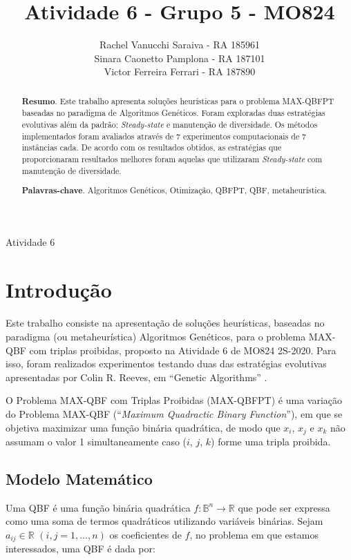\documentclass{MO824}
\title{Atividade 6 - Grupo 5 - MO824}
\author{
    Rachel Vanucchi Saraiva  - RA 185961\\
    Sinara Caonetto Pamplona - RA 187101\\
    Victor Ferreira Ferrari  - RA 187890
}
\newcommand{\B}{\mathbb{B}}
\newcommand{\R}{\mathbb{R}}
\begin{document}
\criartitulo

%
{Atividade 6}

\begin{abstract}
{\bf Resumo}. Este trabalho apresenta soluções heurísticas para o problema MAX-QBFPT baseadas no paradigma de Algoritmos Genéticos. Foram exploradas duas estratégias evolutivas além da padrão:  \textit{Steady-state} e manutenção de diversidade. Os métodos implementados foram avaliados através de 7 experimentos computacionais de 7 instâncias cada. De acordo com os resultados obtidos, as estratégias que proporcionaram resultados melhores foram aquelas que utilizaram \textit{Steady-state} com manutenção de diversidade.

{\bf Palavras-chave}. Algoritmos Genéticos, Otimização, QBFPT, QBF, metaheurística.

\end{abstract}

\section{Introdução}
    \paragraph*{}
    Este trabalho consiste na apresentação de soluções heurísticas, baseadas no paradigma (ou metaheurística) Algoritmos Genéticos, para o problema MAX-QBF com triplas proibidas, proposto na Atividade 6 de MO824 2S-2020. Para isso, foram realizados experimentos testando duas das estratégias evolutivas apresentadas por Colin R. Reeves, em ``Genetic Algorithms'' \cite{ga}.
    
    O Problema MAX-QBF com Triplas Proibidas (MAX-QBFPT) é uma variação do Problema  MAX-QBF (``\textit{Maximum Quadractic Binary Function}''), em que se objetiva maximizar uma função binária quadrática, de modo que $x_i$, $x_j$ e $x_k$ não assumam o valor 1 simultaneamente caso ($i$, $j$, $k$) forme uma tripla proibida. 
    
    \subsection{Modelo Matemático}
    Uma QBF é uma função binária quadrática $f:\B^n \rightarrow \R$ que pode ser expressa como uma soma de termos quadráticos utilizando variáveis binárias. Sejam~$a_{ij} \in \mathbb{R}$ $(i,j = 1,\dots,n)$ os coeficientes de $f$, no problema em que estamos interessados, uma QBF é dada por:
    
\end{document}
